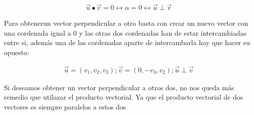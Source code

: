 \documentclass[
	12pt, %
	spanish, %
]{fphw}
\newcommand{\vu}{\vec{u}}
\newcommand{\vv}{\vec{v}}
\begin{document}
\begin{gather*}
	\vu \bullet \vv = 0 \leftrightarrow \alpha = 0 \leftrightarrow  \vu \perp \vv
\end{gather*}

Para obtenerun vector perpendicular a otro basta con crear un nuevo vector con una cordenada igual a 0 y las otras dos cordenadas han de estar intercambiadas entre si, además una de las cordenadas aparte de intercambarla hay que hacer su opuesto:

\begin{gather*}
	\vu=(v_1,v_2,v_3); \vv=(0, -v_3,v_2); \vu \perp \vv
\end{gather*}

Si deseamos obtener un vector perpendicular a otros dos, no nos queda más remedio que utilazar el producto vectorial. Ya que el producto vectorial de dos vectores es siempre paralelos a estos dos
\end{document}
